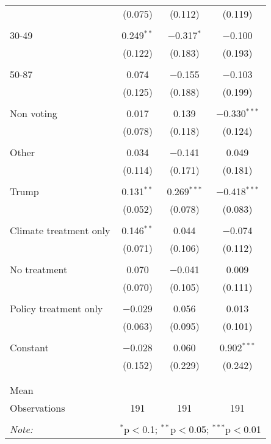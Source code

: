 \begin{tabular}{@{\extracolsep{5pt}}lccc}
  & (0.075) & (0.112) & (0.119) \\ 
  & & & \\ 
 30-49 & 0.249$^{**}$ & $-$0.317$^{*}$ & $-$0.100 \\ 
  & (0.122) & (0.183) & (0.193) \\ 
  & & & \\ 
 50-87 & 0.074 & $-$0.155 & $-$0.103 \\ 
  & (0.125) & (0.188) & (0.199) \\ 
  & & & \\ 
 Non voting & 0.017 & 0.139 & $-$0.330$^{***}$ \\ 
  & (0.078) & (0.118) & (0.124) \\ 
  & & & \\ 
 Other & 0.034 & $-$0.141 & 0.049 \\ 
  & (0.114) & (0.171) & (0.181) \\ 
  & & & \\ 
 Trump & 0.131$^{**}$ & 0.269$^{***}$ & $-$0.418$^{***}$ \\ 
  & (0.052) & (0.078) & (0.083) \\ 
  & & & \\ 
 Climate treatment only & 0.146$^{**}$ & 0.044 & $-$0.074 \\ 
  & (0.071) & (0.106) & (0.112) \\ 
  & & & \\ 
 No treatment & 0.070 & $-$0.041 & 0.009 \\ 
  & (0.070) & (0.105) & (0.111) \\ 
  & & & \\ 
 Policy treatment only & $-$0.029 & 0.056 & 0.013 \\ 
  & (0.063) & (0.095) & (0.101) \\ 
  & & & \\ 
 Constant & $-$0.028 & 0.060 & 0.902$^{***}$ \\ 
  & (0.152) & (0.229) & (0.242) \\ 
  & & & \\ 
\hline \\[-1.8ex] 
Mean &  &  &  \\ 
Observations & 191 & 191 & 191 \\ 
\hline 
\hline \\[-1.8ex] 
\textit{Note:}  & \multicolumn{3}{r}{$^{*}$p$<$0.1; $^{**}$p$<$0.05; $^{***}$p$<$0.01} \\ 
\end{tabular} 
